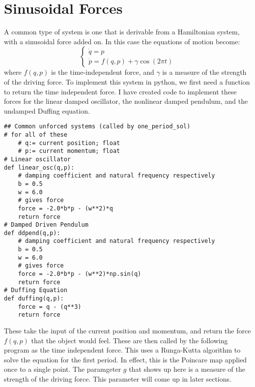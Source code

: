 \documentclass{paper}
\newcommand{\syst}[1]{\left\{\begin{matrix}#1 \end{matrix}\right.}
\begin{document}
\section{Sinusoidal Forces}
A common type of system is one that is derivable from a Hamiltonian system, with a sinusoidal force added on. In this case the equations of motion become:
\begin{equation}
    \syst{
        \dot{q}=p\\
        \dot{p}=f(q,p)+ \gamma \cos(2\pi t)
    }
\end{equation}
where $f(q,p)$ is the time-independent force, and $\gamma$ is a measure of the strength of the driving force. To implement this system in python, we first need a function to return the time independent force. I have created code to implement these forces for the linear damped oscillator, the nonlinear damped pendulum, and the undamped Duffing equation.\\
\begin{lstlisting}
## Common unforced systems (called by one_period_sol)
# for all of these
    # q:= current position; float
    # p:= current momentum; float
# Linear oscillator
def linear_osc(q,p):
    # damping coefficient and natural frequency respectively
    b = 0.5
    w = 6.0
    # gives force
    force = -2.0*b*p - (w**2)*q
    return force
# Damped Driven Pendulum
def ddpend(q,p):
    # damping coefficient and natural frequency respectively
    b = 0.5
    w = 6.0
    # gives force
    force = -2.0*b*p - (w**2)*np.sin(q)
    return force
# Duffing Equation
def duffing(q,p):
    force = q - (q**3)
    return force
\end{lstlisting}
These take the input of the current position and momentum, and return the force $f(q,p)$ that the object would feel. These are then called by the following program as the time independent force. This uses a Runga-Kutta algorithm to solve the equation for the first period. In effect, this is the Poincare map applied once to a single point. The paramgeter $g$ that shows up here is a measure of the strength of the driving force. This parameter will come up in later sections.
\end{document}
